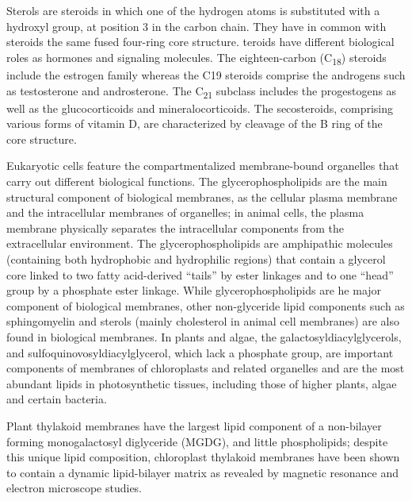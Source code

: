 Sterols are steroids in which one of the hydrogen atoms is substituted with a hydroxyl group, at position 3 in the carbon chain. They have in common with steroids the same fused four-ring core structure. teroids have different biological roles as hormones and signaling molecules. The eighteen-carbon (C\textsubscript{18}) steroids include the estrogen family whereas the C19 steroids comprise the androgens such as testosterone and androsterone. The C\textsubscript{21} subclass includes the progestogens as well as the glucocorticoids and mineralocorticoids. The secosteroids, comprising various forms of vitamin D, are characterized by cleavage of the B ring of the core structure.

Eukaryotic cells feature the compartmentalized membrane-bound organelles that carry out different biological functions. The glycerophospholipids are the main structural component of biological membranes, as the cellular plasma membrane and the intracellular membranes of organelles; in animal cells, the plasma membrane physically separates the intracellular components from the extracellular environment. The glycerophospholipids are amphipathic molecules (containing both hydrophobic and hydrophilic regions) that contain a glycerol core linked to two fatty acid-derived ``tails'' by ester linkages and to one ``head'' group by a phosphate ester linkage. While glycerophospholipids are he major component of biological membranes, other non-glyceride lipid components such as sphingomyelin and sterols (mainly cholesterol in animal cell membranes) are also found in biological membranes. In plants and algae, the galactosyldiacylglycerols, and sulfoquinovosyldiacylglycerol, which lack a phosphate group, are important components of membranes of chloroplasts and related organelles and are the most abundant lipids in photosynthetic tissues, including those of higher plants, algae and certain bacteria.

Plant thylakoid membranes have the largest lipid component of a non-bilayer forming monogalactosyl diglyceride (MGDG), and little phospholipids; despite this unique lipid composition, chloroplast thylakoid membranes have been shown to contain a dynamic lipid-bilayer matrix as revealed by magnetic resonance and electron microscope studies.


